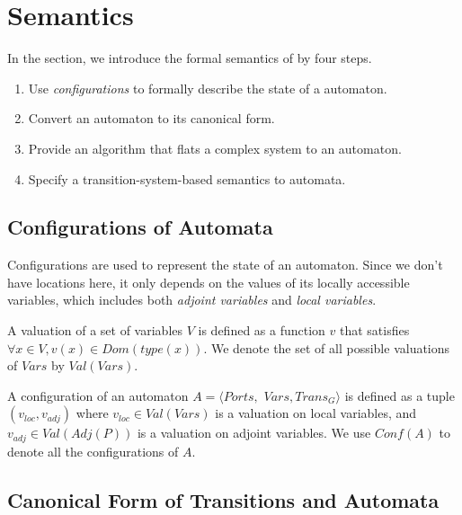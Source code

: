 \section{Semantics}
\label{sec:semantics}

In the section, we introduce the formal semantics of \lang{} by four steps.
\begin{enumerate}
    \item Use \emph{configurations} to formally describe the state of a automaton.
    \item Convert an automaton to its canonical form.
    \item Provide an algorithm that flats a complex system to an automaton.
    \item Specify a transition-system-based semantics to \lang{} automata.
\end{enumerate}


\subsection{Configurations of Automata}
\label{subsec:config}
Configurations are used to represent the state of an automaton. Since we don't have locations here, it only depends on the values of its locally accessible variables, which includes both \emph{adjoint variables} and \emph{local variables}.

\begin{definition}[Valuation]
A valuation of a set of variables $V$ is defined as a function $v$ that satisfies $\forall x\in V,v(x)\in Dom(type(x))$. We denote the set of all possible valuations of $Vars$ by $Val(Vars)$.
\end{definition}

\begin{definition}[Configuration] A configuration of an automaton $A=\langle Ports,$ $Vars,Trans_G\rangle$ is defined as a tuple $(v_{loc},v_{adj})$ where $v_{loc}\in Val(Vars)$ is a valuation on local variables, and $v_{adj}\in Val(Adj(P))$ is a valuation on adjoint variables. We use $Conf(A)$ to denote all the configurations of $A$.
\end{definition}


\subsection{Canonical Form of Transitions and Automata}
\label{subsec:canonical}

